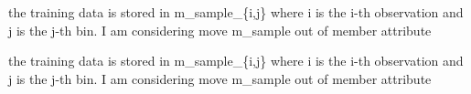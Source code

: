 
\begin{DoxyRefList}
\item[\label{todo__todo000001}%
\hypertarget{todo__todo000001}{}%
Member \hyperlink{classpgpr__data_a569dc41fa124c739d28d05d56874d4c4}{pgpr\-\_\-data\-:\-:get\-Random\-Blk} ()]the training data is stored in m\-\_\-sample\-\_\-\{i,j\} where i is the i-\/th observation and j is the j-\/th bin. I am considering move m\-\_\-sample out of member attribute  
\item[\label{todo__todo000002}%
\hypertarget{todo__todo000002}{}%
Member \hyperlink{classpgpr__data_a1b0b0b000a221c160339ea4207910753}{pgpr\-\_\-data\-:\-:get\-Random\-Walk} ()]the training data is stored in m\-\_\-sample\-\_\-\{i,j\} where i is the i-\/th observation and j is the j-\/th bin. I am considering move m\-\_\-sample out of member attribute 
\end{DoxyRefList}